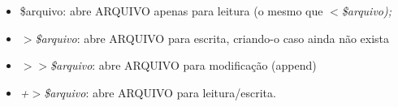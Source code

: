 \begin{itemize}
    \item{\$arquivo: abre ARQUIVO apenas para leitura (o mesmo que \textit{$<$\$arquivo);}}
    \item{\textit{$>$\$arquivo}: abre ARQUIVO para escrita, criando-o caso ainda n\~ao exista}
    \item{\textit{$>>$\$arquivo}: abre ARQUIVO para modificação (append)} 
    \item{\textit{+$>$\$arquivo}: abre ARQUIVO para leitura/escrita. }
\end{itemize}


 